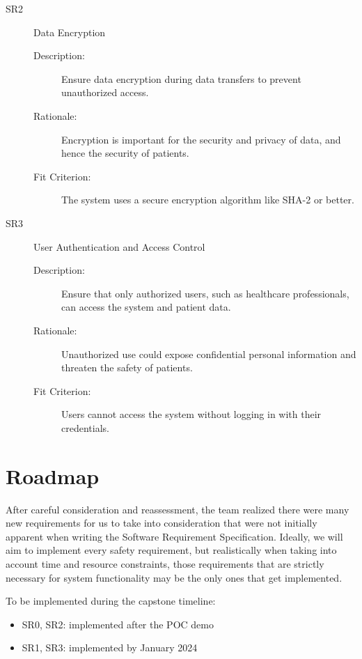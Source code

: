 \documentclass{article}
\begin{document}
\begin{description}
    \item[SR2] Data Encryption
    \begin{description}
        \item[Description:] Ensure data encryption during data transfers to prevent unauthorized access.
        \item[Rationale:] Encryption is important for the security and privacy of data, and hence the security of patients. 
        \item[Fit Criterion:] The system uses a secure encryption algorithm like SHA-2 or better. 
    \end{description}
\end{description}

\begin{description}
    \item[SR3] User Authentication and Access Control
    \begin{description}
        \item[Description:] Ensure that only authorized users, such as healthcare professionals, can access the system and patient data.
        \item[Rationale:] Unauthorized use could expose confidential personal information and threaten the safety of patients.
        \item[Fit Criterion:] Users cannot access the system without logging in with their credentials.
    \end{description}
\end{description}


\section{Roadmap}
After careful consideration and reassessment, the team realized there were many new requirements for us to take into consideration that were not initially apparent when writing the Software Requirement Specification. Ideally, we will aim to implement every safety requirement, but realistically when taking into account time and resource constraints, those requirements that are strictly necessary for system functionality may be the only ones that get implemented.

To be implemented during the capstone timeline: 
\begin{itemize}
    \item SR0, SR2: implemented after the POC demo
    \item SR1, SR3: implemented by January 2024
\end{itemize}
\end{document}
